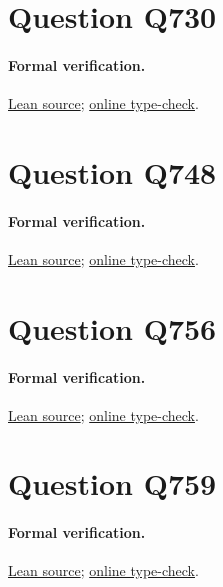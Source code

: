 \documentclass[11pt]{article}
\begin{document}
\section{Question Q730}

\paragraph{Formal verification.}
\href{https://github.com/l-pommeret/rms-math-proofs/tree/e3955b96dac273c9bc03717e9cc8c73239453bf4/lean/RMS}{Lean source}; \href{https://github.com/l-pommeret/rms-math-proofs/actions/runs/31286132535}{online type-check}.

\section{Question Q748}

\paragraph{Formal verification.}
\href{https://github.com/l-pommeret/rms-math-proofs/blob/f455b2d07f0f5017b8823cc8afa699ac0fdd2be7/lean/RMS/Q748Sigma2Lower.lean}{Lean source}; \href{https://github.com/l-pommeret/rms-math-proofs/actions/runs/31290571122}{online type-check}.

\section{Question Q756}

\paragraph{Formal verification.}
\href{https://github.com/l-pommeret/rms-math-proofs/tree/edd84d97423d735d0d6f8e68233cbe276b820f4b/lean/RMS}{Lean source}; \href{https://github.com/l-pommeret/rms-math-proofs/actions/runs/31285350393}{online type-check}.

\section{Question Q759}

\paragraph{Formal verification.}
\href{https://github.com/l-pommeret/rms-math-proofs/blob/70db705be85233d6a934d71a167399e6c8a7be7f/lean/RMS/Q759.lean}{Lean source}; \href{https://github.com/l-pommeret/rms-math-proofs/actions/runs/31284673625}{online type-check}.
\end{document}
